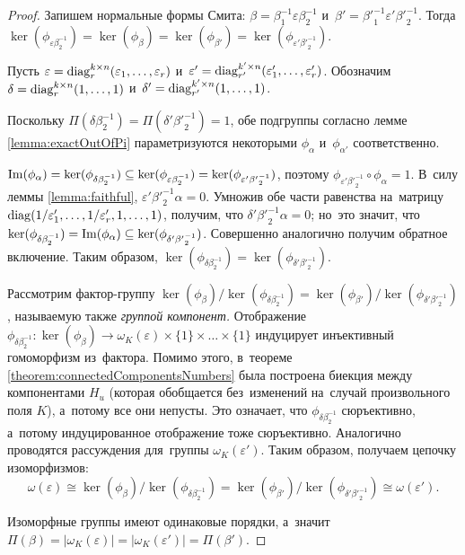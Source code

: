 \documentclass{article}
\begin{document}
\begin{proof}
    Запишем нормальные формы Смита: $\beta = \beta_1^{-1} \varepsilon \beta_2^{-1}$
    и~$\beta' = {\beta'}_1^{-1} \varepsilon' {\beta'}_2^{-1}$.
    Тогда $\ker(\phi_{\varepsilon \beta_2^{-1}}) = \ker(\phi_{\beta}) = \ker(\phi_{\beta'}) = \ker(\phi_{\varepsilon' {\beta'}_2^{-1}})$.

    Пусть $\varepsilon = \mathrm{diag}^{k \times n}_r(\varepsilon_1, \ldots, \varepsilon_r)$
    и~$\varepsilon' = \mathrm{diag}^{k' \times n}_{r'}(\varepsilon'_1, \ldots, \varepsilon'_r)$.
    Обозначим $\delta = \mathrm{diag}^{k \times n}_r(1, \ldots, 1)$ и~$\delta' = \mathrm{diag}^{k' \times n}_{r'}(1, \ldots, 1)$.

    Поскольку $\Pi(\delta \beta_2^{-1}) = \Pi(\delta' {\beta'}_2^{-1}) = 1$, обе подгруппы согласно лемме \ref{lemma:exactOutOfPi}
    параметризуются некоторыми $\phi_\alpha$ и~$\phi_{\alpha'}$ соответственно.

    $\mathrm{Im}(\phi_\alpha) = \ker(\phi_{\delta \beta_2^{-1}}) \subseteq \ker(\phi_{\varepsilon \beta_2^{-1}}) = \ker(\phi_{\varepsilon' {\beta'}_2^{-1}})$,
    поэтому $\phi_{\varepsilon' {\beta'}_2^{-1}} \circ \phi_\alpha = 1$.
    В~силу леммы \ref{lemma:faithful}, $\varepsilon' {\beta'}_2^{-1} \alpha = 0$.
    Умножив обе части равенства на~матрицу
    $\mathrm{diag}(1 / \varepsilon'_1, \ldots, 1 / \varepsilon'_r, 1, \ldots, 1)$, получим, что $\delta' {\beta'}_2^{-1} \alpha = 0$;
    но~это значит, что $\ker(\phi_{\delta \beta_2^{-1}}) = \mathrm{Im}(\phi_\alpha) \subseteq \ker(\phi_{\delta' {\beta'}_2^{-1}})$.
    Совершенно аналогично получим обратное включение. Таким образом, $\ker(\phi_{\delta \beta_2^{-1}}) = \ker(\phi_{\delta' {\beta'}_2^{-1}})$.

    Рассмотрим фактор-группу $\ker(\phi_\beta) / \ker(\phi_{\delta \beta_2^{-1}}) = \ker(\phi_{\beta'}) / \ker(\phi_{\delta' {\beta'}_2^{-1}})$,
    называемую также \textit{группой компонент.}
    Отображение $\phi_{\delta \beta_2^{-1}} : \ker(\phi_\beta) \rightarrow \omega_K(\varepsilon) \times \{ 1 \} \times \ldots \times \{ 1 \}$
    индуцирует инъективный гомоморфизм из~фактора. Помимо этого, в~теореме \ref{theorem:connectedComponentsNumbers} была построена биекция между компонентами $H_u$ (которая обобщается
    без~изменений на~случай произвольного поля $K$), а~потому все они непусты.
    Это означает, что $\phi_{\delta \beta_2^{-1}}$ сюръективно, а~потому индуцированное отображение тоже сюръективно.
    Аналогично проводятся рассуждения для~группы $\omega_K(\varepsilon')$.
    Таким образом, получаем цепочку изоморфизмов:
    $$
        \omega(\varepsilon) \cong \ker(\phi_\beta) / \ker(\phi_{\delta \beta_2^{-1}}) = \ker(\phi_{\beta'}) / \ker(\phi_{\delta' {\beta'}_2^{-1}}) \cong \omega(\varepsilon').
    $$

    Изоморфные группы имеют одинаковые порядки, а~значит $\Pi(\beta) = |\omega_K(\varepsilon)| = |\omega_K(\varepsilon')| = \Pi(\beta')$.
\end{proof}
\end{document}
